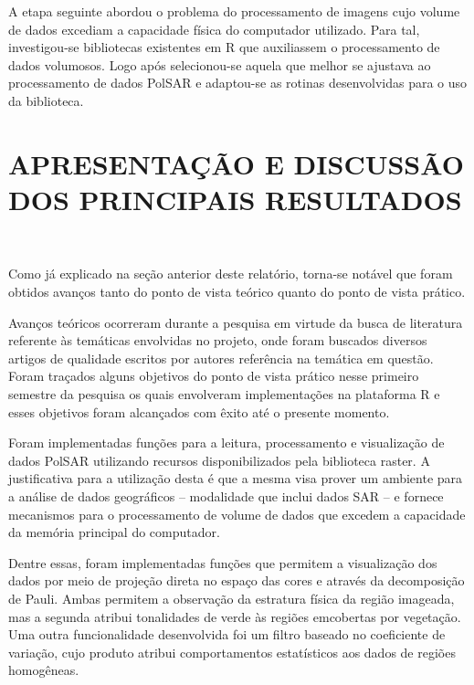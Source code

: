 \documentclass[12pt,letterpaper]{article}
\begin{document}
A etapa seguinte abordou o problema do processamento de imagens cujo volume de dados excediam a capacidade física do computador utilizado. Para tal, investigou-se bibliotecas existentes em R que auxiliassem o processamento de dados volumosos. Logo após selecionou-se aquela que melhor se ajustava ao processamento de dados PolSAR e adaptou-se as rotinas desenvolvidas para o uso da biblioteca.

\newpage
\section*{\centering \textbf{APRESENTAÇÃO E DISCUSSÃO DOS PRINCIPAIS RESULTADOS}}
\hrulefill \\

\vspace{0.5cm}

Como já explicado na seção anterior deste relatório, torna-se notável que foram obtidos avanços tanto do ponto de vista teórico quanto do ponto de vista prático.

Avanços teóricos ocorreram durante a pesquisa em virtude da busca de literatura referente às temáticas envolvidas no projeto, onde foram buscados diversos artigos de qualidade escritos por autores referência na temática em questão. Foram traçados alguns objetivos do ponto de vista prático nesse primeiro semestre da pesquisa os quais envolveram implementações na plataforma R e esses objetivos foram alcançados com êxito até o presente momento.

Foram implementadas funções para a leitura, processamento e visualização de dados PolSAR utilizando recursos disponibilizados pela biblioteca raster. A justificativa para a utilização desta é que a mesma visa prover um ambiente para a análise de dados geográficos -- modalidade que inclui dados SAR -- e fornece mecanismos para o processamento de volume de dados que excedem a capacidade da memória principal do computador. 

Dentre essas, foram implementadas funções que permitem a visualização dos dados por meio de projeção direta no espaço das cores e através da decomposição de Pauli. Ambas permitem a observação da estratura física da região imageada, mas a segunda atribui tonalidades de verde às regiões emcobertas por vegetação. Uma outra funcionalidade desenvolvida foi um filtro baseado no coeficiente de variação, cujo produto atribui comportamentos estatísticos aos dados de regiões homogêneas.
\end{document}
